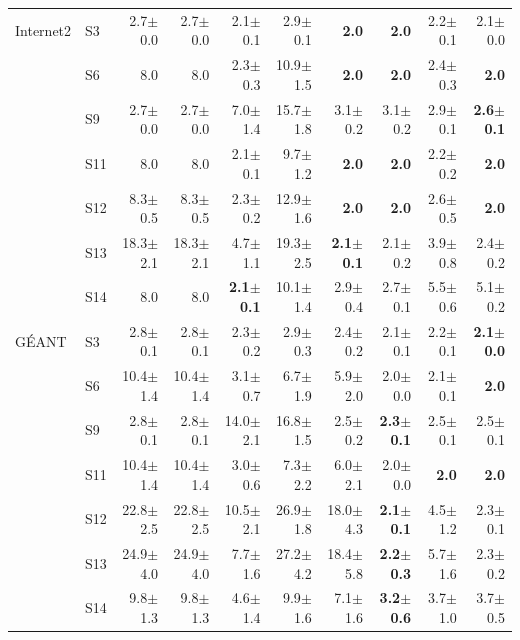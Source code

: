 \begin{table}[t]
\begin{tabular}{llrrrrrrrr}
\midrule
Internet2 & S3 & 2.7$\pm$0.0 & 2.7$\pm$0.0 & 2.1$\pm$0.1 & 2.9$\pm$0.1 & \textbf{2.0} & \textbf{2.0} & 2.2$\pm$0.1 & 2.1$\pm$0.0\\
 & S6 & 8.0 & 8.0 & 2.3$\pm$0.3 & 10.9$\pm$1.5 & \textbf{2.0} & \textbf{2.0} & 2.4$\pm$0.3 & \textbf{2.0}\\
 & S9 & 2.7$\pm$0.0 & 2.7$\pm$0.0 & 7.0$\pm$1.4 & 15.7$\pm$1.8 & 3.1$\pm$0.2 & 3.1$\pm$0.2 & 2.9$\pm$0.1 & \textbf{2.6$\pm$0.1}\\
 & S11 & 8.0 & 8.0 & 2.1$\pm$0.1 & 9.7$\pm$1.2 & \textbf{2.0} & \textbf{2.0} & 2.2$\pm$0.2 & \textbf{2.0}\\
 & S12 & 8.3$\pm$0.5 & 8.3$\pm$0.5 & 2.3$\pm$0.2 & 12.9$\pm$1.6 & \textbf{2.0} & \textbf{2.0} & 2.6$\pm$0.5 & \textbf{2.0}\\
 & S13 & 18.3$\pm$2.1 & 18.3$\pm$2.1 & 4.7$\pm$1.1 & 19.3$\pm$2.5 & \textbf{2.1$\pm$0.1} & 2.1$\pm$0.2 & 3.9$\pm$0.8 & 2.4$\pm$0.2\\
 & S14 & 8.0 & 8.0 & \textbf{2.1$\pm$0.1} & 10.1$\pm$1.4 & 2.9$\pm$0.4 & 2.7$\pm$0.1 & 5.5$\pm$0.6 & 5.1$\pm$0.2\\
\midrule
G\'EANT & S3 & 2.8$\pm$0.1 & 2.8$\pm$0.1 & 2.3$\pm$0.2 & 2.9$\pm$0.3 & 2.4$\pm$0.2 & 2.1$\pm$0.1 & 2.2$\pm$0.1 & \textbf{2.1$\pm$0.0}\\
 & S6 & 10.4$\pm$1.4 & 10.4$\pm$1.4 & 3.1$\pm$0.7 & 6.7$\pm$1.9 & 5.9$\pm$2.0 & 2.0$\pm$0.0 & 2.1$\pm$0.1 & \textbf{2.0}\\
 & S9 & 2.8$\pm$0.1 & 2.8$\pm$0.1 & 14.0$\pm$2.1 & 16.8$\pm$1.5 & 2.5$\pm$0.2 & \textbf{2.3$\pm$0.1} & 2.5$\pm$0.1 & 2.5$\pm$0.1\\
 & S11 & 10.4$\pm$1.4 & 10.4$\pm$1.4 & 3.0$\pm$0.6 & 7.3$\pm$2.2 & 6.0$\pm$2.1 & 2.0$\pm$0.0 & \textbf{2.0} & \textbf{2.0}\\
 & S12 & 22.8$\pm$2.5 & 22.8$\pm$2.5 & 10.5$\pm$2.1 & 26.9$\pm$1.8 & 18.0$\pm$4.3 & \textbf{2.1$\pm$0.1} & 4.5$\pm$1.2 & 2.3$\pm$0.1\\
 & S13 & 24.9$\pm$4.0 & 24.9$\pm$4.0 & 7.7$\pm$1.6 & 27.2$\pm$4.2 & 18.4$\pm$5.8 & \textbf{2.2$\pm$0.3} & 5.7$\pm$1.6 & 2.3$\pm$0.2\\
 & S14 & 9.8$\pm$1.3 & 9.8$\pm$1.3 & 4.6$\pm$1.4 & 9.9$\pm$1.6 & 7.1$\pm$1.6 & \textbf{3.2$\pm$0.6} & 3.7$\pm$1.0 & 3.7$\pm$0.5\\
\bottomrule
\end{tabular}
\end{table}